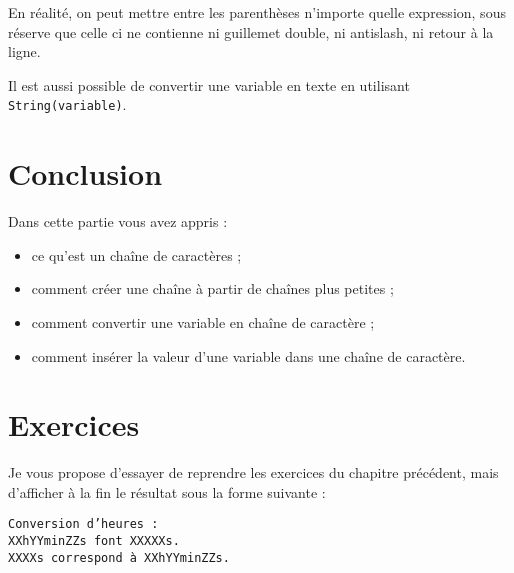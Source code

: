 En réalité, on peut mettre entre les parenthèses n'importe quelle expression, sous réserve que celle ci ne contienne ni guillemet double, ni antislash, ni retour à la ligne.

Il est aussi possible de convertir une variable en texte en utilisant \texttt{String(variable)}.

\section*{Conclusion}
{}
Dans cette partie vous avez appris :
\begin{itemize}
\item ce qu'est un chaîne de caractères ;
\item comment créer une chaîne à partir de chaînes plus petites ;
\item comment convertir une variable en chaîne de caractère ;
\item comment insérer la valeur d'une variable dans une chaîne de caractère.
\end{itemize}
\section*{Exercices}
{}
Je vous propose d'essayer de reprendre les exercices du chapitre précédent, mais d'afficher à la fin le résultat sous la forme suivante :
\begin{verbatim}
Conversion d’heures :
XXhYYminZZs font XXXXXs.
XXXXs correspond à XXhYYminZZs.
\end{verbatim}
